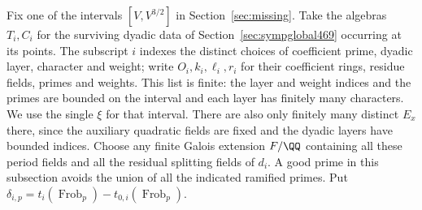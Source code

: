 \documentclass[a4paper,11pt]{article}
\theoremstyle{definition}
\theoremstyle{remark}
\numberwithin{equation}{section}
\begin{document}
Fix one of the intervals \([V,V^{3/2}]\) in Section~\ref{sec:missing}.
Take the algebras \(T_i,C_i\) for the surviving dyadic data of
Section~\ref{sec:sympglobal469} occurring at its points. The
subscript \(i\) indexes the distinct choices of coefficient prime,
dyadic layer, character and weight; write \(O_i,k_i,\ell_i,r_i\)
for their coefficient rings, residue fields, primes and weights.
This list is finite: the layer and weight indices and the primes
are bounded on the interval and each layer has finitely many
characters. We use the single \(\xi\) for that interval. There
are also only finitely many distinct \(E_x\) there, since the
auxiliary quadratic fields are fixed and the dyadic layers have
bounded indices. Choose any finite Galois extension \(F/\QQ\)
containing all these period fields and all the residual splitting
fields of \(d_i\). A good prime in this subsection avoids the
union of all the indicated ramified primes. Put
\(\delta_{i,p}=t_i(\operatorname{Frob}_p)-t_{0,i}(\operatorname{Frob}_p)\).
\end{document}
